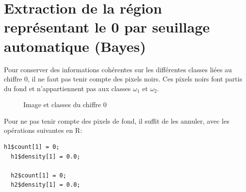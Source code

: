 \documentclass[a4paper,11pt]{article}
\begin{document}
  \section{Extraction de la région représentant le 0 par seuillage automatique (Bayes)}
  
  Pour conserver des informations cohérentes sur les différentes classes liées au chiffre 0,
  il ne faut pas tenir compte des pixels noirs. Ces pixels noirs font partis du fond et 
  n'appartiennent pas aux classes $\omega_1$ et $\omega_2$.
  
  \begin{figure}[H]
    \center
    \caption{Image et classes du chiffre 0}
  \end{figure}
  
  Pour ne pas tenir compte des pixels de fond, il suffit de les annuler, avec les 
  opérations suivantes en R:
  
  \begin{lstlisting}[caption=Annuler les pixels de fond]
  h1$count[1] = 0;
  h1$density[1] = 0.0;
  
  h2$count[1] = 0;
  h2$density[1] = 0.0;
  \end{lstlisting}
  
\end{document}
